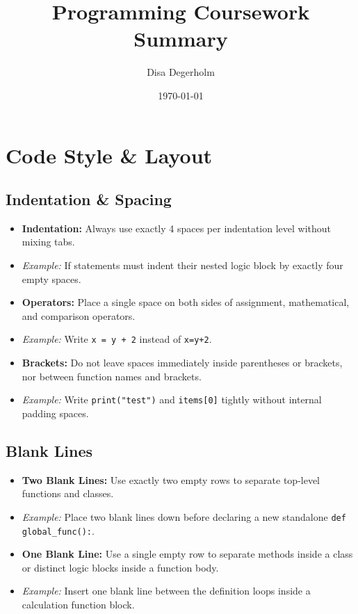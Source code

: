 \documentclass{article}
\title{Programming Coursework Summary}
\author{Disa Degerholm}
\date{\today}
\begin{document}
\maketitle

\section{Code Style \& Layout}

\subsection{Indentation \& Spacing}
\begin{itemize}
    \item \textbf{Indentation:} Always use exactly 4 spaces per indentation level without mixing tabs. 
    \item[] \textit{Example:} If statements must indent their nested logic block by exactly four empty spaces.
    \item \textbf{Operators:} Place a single space on both sides of assignment, mathematical, and comparison operators.
    \item[] \textit{Example:} Write \texttt{x = y + 2} instead of \texttt{x=y+2}.
    \item \textbf{Brackets:} Do not leave spaces immediately inside parentheses or brackets, nor between function names and brackets.
    \item[] \textit{Example:} Write \texttt{print("test")} and \texttt{items[0]} tightly without internal padding spaces.
\end{itemize}

\subsection{Blank Lines}
\begin{itemize}
    \item \textbf{Two Blank Lines:} Use exactly two empty rows to separate top-level functions and classes.
    \item[] \textit{Example:} Place two blank lines down before declaring a new standalone \texttt{def global\_func():}.
    \item \textbf{One Blank Line:} Use a single empty row to separate methods inside a class or distinct logic blocks inside a function body.
    \item[] \textit{Example:} Insert one blank line between the definition loops inside a calculation function block.
\end{itemize}
\end{document}
